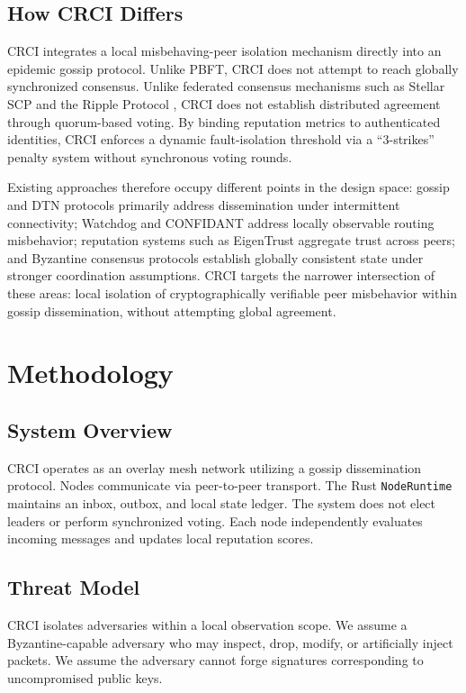 \documentclass[conference]{IEEEtran}
\begin{document}
\subsection{How CRCI Differs}
CRCI integrates a local misbehaving-peer isolation mechanism directly into an epidemic gossip protocol. Unlike PBFT, CRCI does not attempt to reach globally synchronized consensus. Unlike federated consensus mechanisms such as Stellar SCP \cite{mazieres2015stellar} and the Ripple Protocol \cite{schwartz2014ripple}, CRCI does not establish distributed agreement through quorum-based voting. By binding reputation metrics to authenticated identities, CRCI enforces a dynamic fault-isolation threshold via a ``3-strikes'' penalty system without synchronous voting rounds.

Existing approaches therefore occupy different points in the design space: gossip and DTN protocols primarily address dissemination under intermittent connectivity; Watchdog and CONFIDANT address locally observable routing misbehavior; reputation systems such as EigenTrust aggregate trust across peers; and Byzantine consensus protocols establish globally consistent state under stronger coordination assumptions. CRCI targets the narrower intersection of these areas: local isolation of cryptographically verifiable peer misbehavior within gossip dissemination, without attempting global agreement.

\section{Methodology}
\label{sec:methodology}

\subsection{System Overview}
CRCI operates as an overlay mesh network utilizing a gossip dissemination protocol. Nodes communicate via peer-to-peer transport. The Rust \texttt{NodeRuntime} maintains an inbox, outbox, and local state ledger. The system does not elect leaders or perform synchronized voting. Each node independently evaluates incoming messages and updates local reputation scores.

\subsection{Threat Model}
CRCI isolates adversaries within a local observation scope. We assume a Byzantine-capable adversary who may inspect, drop, modify, or artificially inject packets. We assume the adversary cannot forge signatures corresponding to uncompromised public keys.
\end{document}
